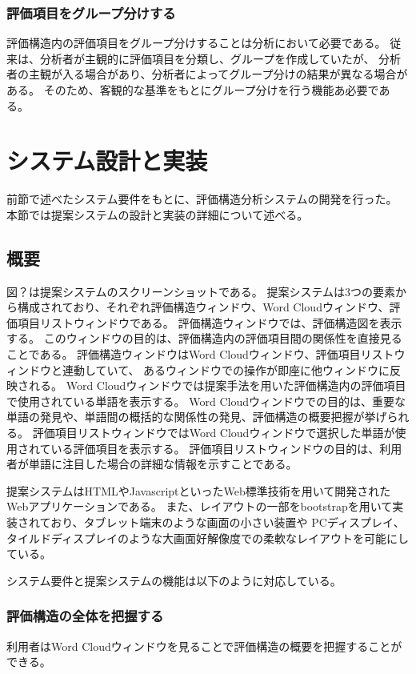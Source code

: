 \documentclass[syuuron]{kuee}
\begin{document}
		\subsubsection{評価項目をグループ分けする}
			評価構造内の評価項目をグループ分けすることは分析において必要である。
			従来は、分析者が主観的に評価項目を分類し、グループを作成していたが、
			分析者の主観が入る場合があり、分析者によってグループ分けの結果が異なる場合がある。
			そのため、客観的な基準をもとにグループ分けを行う機能あ必要である。
	\section{システム設計と実装}%
		前節で述べたシステム要件をもとに、評価構造分析システムの開発を行った。
		本節では提案システムの設計と実装の詳細について述べる。
		\subsection{概要}
			図？は提案システムのスクリーンショットである。
			提案システムは3つの要素から構成されており、それぞれ評価構造ウィンドウ、Word Cloudウィンドウ、評価項目リストウィンドウである。
			評価構造ウィンドウでは、評価構造図を表示する。
			このウィンドウの目的は、評価構造内の評価項目間の関係性を直接見ることである。
			評価構造ウィンドウはWord Cloudウィンドウ、評価項目リストウィンドウと連動していて、
			あるウィンドウでの操作が即座に他ウィンドウに反映される。
			Word Cloudウィンドウでは提案手法を用いた評価構造内の評価項目で使用されている単語を表示する。
			Word Cloudウィンドウでの目的は、重要な単語の発見や、単語間の概括的な関係性の発見、評価構造の概要把握が挙げられる。
			評価項目リストウィンドウではWord Cloudウィンドウで選択した単語が使用されている評価項目を表示する。
			評価項目リストウィンドウの目的は、利用者が単語に注目した場合の詳細な情報を示すことである。
			
			提案システムはHTMLやJavascriptといったWeb標準技術を用いて開発されたWebアプリケーションである。
			また、レイアウトの一部をbootstrapを用いて実装されており、タブレット端末のような画面の小さい装置や
			PCディスプレイ、タイルドディスプレイのような大画面好解像度での柔軟なレイアウトを可能にしている。
			
			システム要件と提案システムの機能は以下のように対応している。
			\subsubsection{評価構造の全体を把握する}
				利用者はWord Cloudウィンドウを見ることで評価構造の概要を把握することができる。
\end{document}
